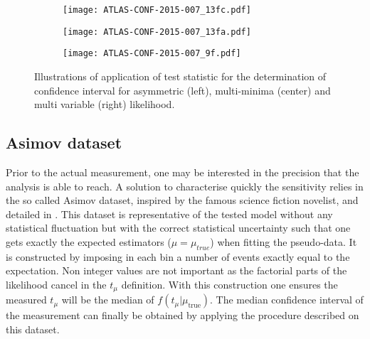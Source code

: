\begin{figure}[htbp]
\begin{subfigure}[t]{0.32\linewidth}
\begin{center}
  \texttt{[image: ATLAS-CONF-2015-007\_13fc.pdf]}
\end{center}
\end{subfigure}
\begin{subfigure}[t]{0.32\linewidth}
\begin{center}
\texttt{[image: ATLAS-CONF-2015-007\_13fa.pdf]}
\end{center}
\end{subfigure}
\begin{subfigure}[t]{0.32\linewidth}
\begin{center}
\texttt{[image: ATLAS-CONF-2015-007\_9f.pdf]}
\end{center}
\end{subfigure}
\caption{\label{orgb73d0b1}
Illustrations of application of test statistic for the determination of confidence interval for asymmetric (left), multi-minima (center) and multi variable (right) likelihood.\cite{ATLAS-CONF-2015-007}}
\end{figure}


\subsection{Asimov dataset}
  \label{sec:org561a813}

Prior to the actual measurement, one may be interested in the precision that the analysis is able to reach.
A solution to characterise quickly the sensitivity relies in the so called Asimov dataset, inspired by the famous science fiction novelist, and detailed in \cite{Cowan:1071727}.
This dataset is representative of the tested model without any statistical fluctuation but with the correct statistical uncertainty such that one gets exactly the expected estimators (\(\hat{\mu}=\mu_{true}\)) when fitting the pseudo-data.
It is constructed by imposing in each bin a number of events exactly equal to the expectation.
Non integer values are not important as the factorial parts of the likelihood cancel in the $t_\mu$ definition.
With this construction one ensures the measured $t_\mu$ will be the median of $f(t_{\mu}|\mu_{\text{true}})$.
The median confidence interval of the measurement can finally be obtained by applying the procedure described on this dataset.
